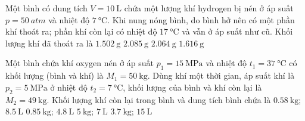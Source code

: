 \begin{ex}
	Một bình có dung tích $V=\SI{10}{\liter}$ chứa một lượng khí hydrogen bị nén ở áp suất $p=\SI{50}{atm}$ và nhiệt độ $\SI{7}{\celsius}$. Khi nung nóng bình, do bình hở nên có một phần khí thoát ra; phần khí còn lại có nhiệt độ $\SI{17}{\celsius}$ và vẫn ở áp suất như cũ. Khối lượng khí đã thoát ra là
	\choice
	{\True $\SI{1.502}{\gram}$}
	{$\SI{2.085}{\gram}$}
	{$\SI{2.064}{\gram}$}
	{$\SI{1.616}{\gram}$}
\end{ex}
\begin{ex}
Một bình chứa khí oxygen nén ở áp suất $p_1=\SI{15}{\mega\pascal}$ và nhiệt độ $t_1=\SI{37}{\celsius}$ có khối lượng (bình và khí) là $M_1=\SI{50}{\kilogram}$. Dùng khí một thời gian, áp suất khí là $p_2=\SI{5}{\mega\pascal}$ ở nhiệt độ $t_2=\SI{7}{\celsius}$, khối lượng của bình và khí còn lại là $M_2=\SI{49}{\kilogram}$. Khối lượng khí còn lại trong bình và dung tích bình chứa là	
	\choice
	{\True $\SI{0.58}{\kilogram}$; $\SI{8.5}{\liter}$}
	{$\SI{0.85}{\kilogram}$; $\SI{4.8}{\liter}$}
	{$\SI{5}{\kilogram}$; $\SI{7}{\liter}$}
	{$\SI{3.7}{\kilogram}$; $\SI{15}{\liter}$}
\end{ex}
